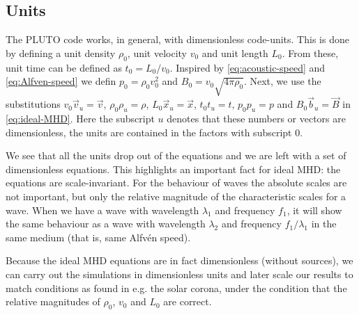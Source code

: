 \subsection{Units}
The PLUTO code works, in general, with dimensionless code-units. This is done by defining a unit density $\rho_0$, unit velocity $v_0$ and unit length $L_0$.
From these, unit time can be defined as $t_0=L_0/v_0$. Inspired by \autoref{eq:acoustic-speed} and \autoref{eq:Alfven-speed} we defin $p_0=\rho_0v_0^2$ and $B_0=v_0\sqrt{4\pi\rho_0}$.
Next, we use the substitutions $v_0\vec{v}_u=\vec{v}$, $\rho_0\rho_u=\rho$, $L_0\vec{x}_u=\vec{x}$, $t_0t_u=t$, $p_0p_u=p$ and $B_0\vec{b}_u=\vec{B}$ in \autoref{eq:ideal-MHD}.
Here the subscript $u$ denotes that these numbers or vectors are dimensionless, the units are contained in the factors with subscript $0$.

{\centering 
\noindent {}
\par}

We see that all the units drop out of the equations and we are left with a set of dimensionless equations.
This highlights an important fact for ideal MHD: the equations are scale-invariant.
For the behaviour of waves the absolute scales are not important, but only the relative magnitude of the characteristic scales for a wave.
When we have a wave with wavelength $\lambda_1$ and frequency $f_1$, it will show the same behaviour as a wave with wavelength $\lambda_2$ and frequency $f_1/\lambda_1$ in the same medium (that is, same Alfvén speed).

Because the ideal MHD equations are in fact dimensionless (without sources), we can carry out the simulations in dimensionless units and later scale our results to match conditions as found in e.g. the solar corona, under the condition that the relative magnitudes of $\rho_0$, $v_0$ and $L_0$ are correct.


